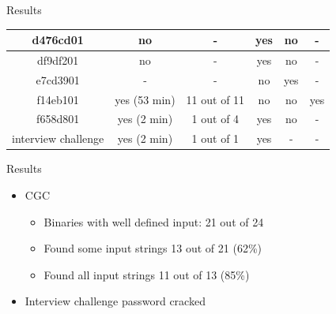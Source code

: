 \documentclass[pdf]{beamer}
\begin{document}
\begin{frame}{Results}
\begin{table}
{\begin{tabular}{|c|c|c|c|c|c|}
d476cd01 & no & - & yes & no & - \\ \hline
df9df201 & no & - & yes & no & - \\ \hline
e7cd3901 & - & - & no & yes & - \\ \hline
f14eb101 & yes (53 min) & 11 out of 11 & no & no & yes \\ \hline
f658d801 & yes (2 min) & 1 out of 4 & yes & no & - \\ \hline
interview challenge & yes (2 min) & 1 out of 1 & yes & - & - \\ \hline
\end{tabular}}
\end{table}
\end{frame}

\begin{frame}{Results}
\begin{itemize}
\item CGC
	\begin{itemize}
	\item Binaries with well defined input: 21 out of 24
	\item Found some input strings 13 out of 21 (62\%)
	\item Found all input strings 11 out of 13 (85\%)
	\end{itemize}
\item Interview challenge password cracked
\end{itemize}
\end{frame}
\end{document}
